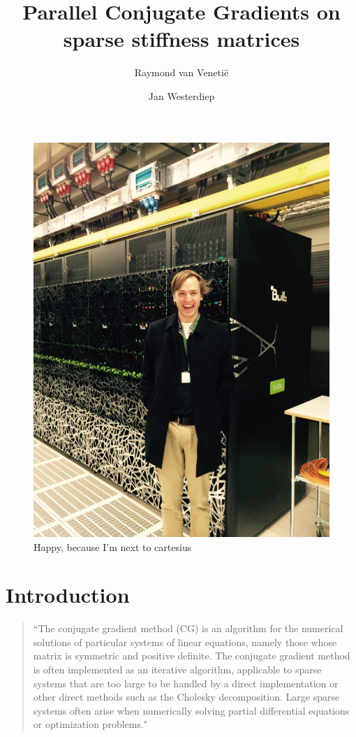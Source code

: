 \documentclass[11pt]{amsart}
\theoremstyle{definition}
\begin{document}
\title{Parallel Conjugate Gradients on sparse stiffness matrices}
\author{Raymond van Veneti\"e \and Jan Westerdiep}
\maketitle
\begin{figure}[h!]
	\center
  \includegraphics[scale=0.5]{Ray_surf.jpg}
   \caption{Happy, because I'm next to cartesius}
\end{figure}

\section{Introduction}
\begin{quote}
``The conjugate gradient method (CG) is an algorithm for the numerical solutions of particular systems of linear equations, namely those whose matrix is symmetric and positive definite. The conjugate gradient method is often implemented as an iterative algorithm, applicable to sparse systems that are too large to be handled by a direct implementation or other direct methods such as the Cholesky decomposition. Large sparse systems often arise when numerically solving partial differential equations or optimization problems." \cite{wiki:cg}
\end{quote}
\end{document}
